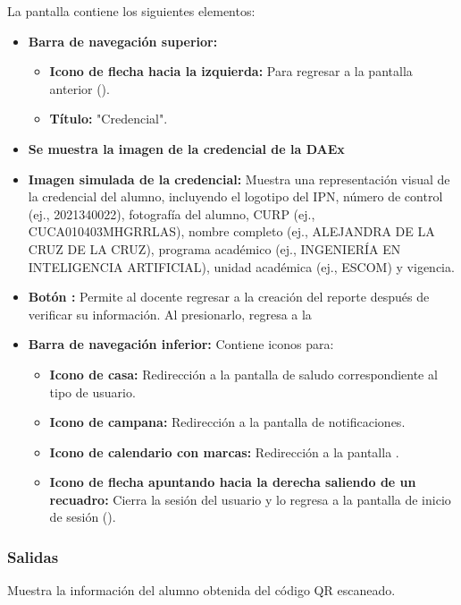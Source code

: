 La pantalla contiene los siguientes elementos:
\begin{itemize}
	\item \textbf{Barra de navegación superior:}
	\begin{itemize}
		\item \textbf{Icono de flecha hacia la izquierda:} Para regresar a la pantalla anterior ().
		\item \textbf{Título:} "Credencial".
	\end{itemize}
	\item \textbf{Se muestra la imagen de la credencial de la DAEx}
	\item \textbf{Imagen simulada de la credencial:} Muestra una representación visual de la credencial del alumno, incluyendo el logotipo del IPN, número de control (ej., 2021340022), fotografía del alumno, CURP (ej., CUCA010403MHGRRLAS), nombre completo (ej., ALEJANDRA DE LA CRUZ DE LA CRUZ), programa académico (ej., INGENIERÍA EN INTELIGENCIA ARTIFICIAL), unidad académica (ej., ESCOM) y vigencia.
	\item \textbf{Botón :} Permite al docente regresar a la creación del reporte después de verificar su información. Al presionarlo, regresa a la 
	\item \textbf{Barra de navegación inferior:} Contiene iconos para:
	\begin{itemize}
		\item \textbf{Icono de casa:} Redirección a la pantalla de saludo correspondiente al tipo de usuario.
		\item \textbf{Icono de campana:} Redirección a la pantalla de notificaciones.
		\item \textbf{Icono de calendario con marcas:} Redirección a la pantalla .
		\item \textbf{Icono de flecha apuntando hacia la derecha saliendo de un recuadro:} Cierra la sesión del usuario y lo regresa a la pantalla de inicio de sesión ().
	\end{itemize}
\end{itemize}

\subsubsection{Salidas}
Muestra la información del alumno obtenida del código QR escaneado.


